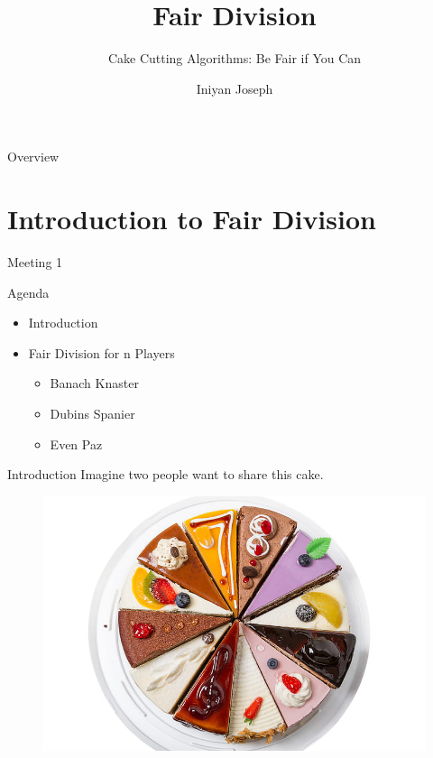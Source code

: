 \documentclass[aspectratio=169,xcolor=dvipsnames]{beamer}
\title[short title]{Fair Division} %
\subtitle{Cake Cutting Algorithms: Be Fair if You Can}
\author[Iniyan Joseph] {Iniyan Joseph}
\institute[UTD] %
{
    University of Texas at Dallas %
}
\date{} %
\begin{document}

\begin{frame}
    \titlepage
\end{frame}

\begin{frame}{Overview}
    \tableofcontents
\end{frame}

\section{Introduction to Fair Division}
\begin{frame}{Meeting 1}
	\begin{block}{Agenda}
		\begin{itemize}
			\item Introduction
			\item Fair Division for n Players
			\begin{itemize}
				\item Banach Knaster
				\item Dubins Spanier
				\item Even Paz
			\end{itemize}
		\end{itemize}
	\end{block}
\end{frame}
\begin{frame}{Introduction}
	Imagine two people want to share this cake.
	\begin{figure}
		\includegraphics[width=0.75\linewidth]{cakeImage}
	\end{figure}
\end{frame}
\end{document}
